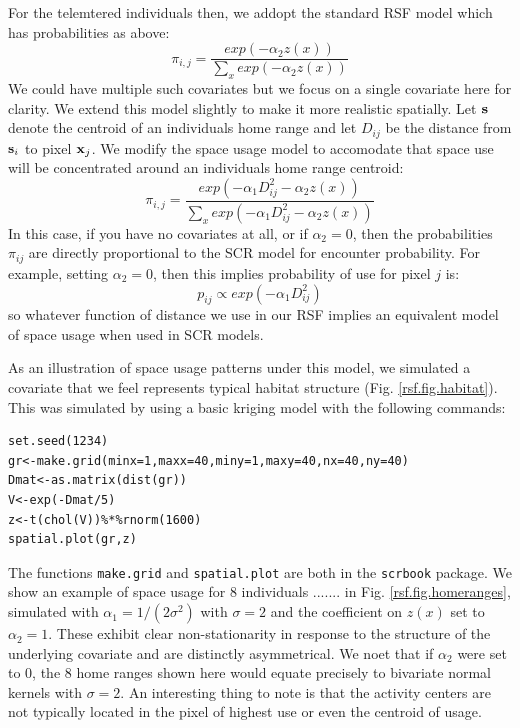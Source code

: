 For the telemtered individuals then, 
we addopt the standard RSF
model  which has probabilities as above:
\[
 \pi_{i,j} = \frac{ exp( -\alpha_{2} z(x) ) }{ \sum_{x} exp(-\alpha_{2} z(x))} 
\]
We could have multiple such covariates but we focus on a
single covariate here for clarity.  We extend this model slightly to
make it more realistic spatially. Let ${\bf s}$ denote the centroid of
an individuals home range and let $D_{ij}$ be the distance from ${\bf
  s}_{i}$ to pixel ${\bf x}_{j}$. We modify the space usage model to
accomodate that space use will be concentrated 
around an individuals home range centroid:
\[
 \pi_{i,j} = \frac{ exp( -\alpha_{1} D_{ij}^{2} -\alpha_{2} z(x) ) }
{ \sum_{x} exp(-\alpha_{1} D_{ij}^{2} -\alpha_{2} z(x))} 
\]
In this case, if you have no covariates at all, or if $\alpha_{2} =
0$, then 
the probabilities $\pi_{ij}$ are directly proportional to the SCR
model for encounter probability.
For example, setting $\alpha_{2} = 0$, then this implies probability
of use for pixel $j$ is:
\[
p_{ij} \propto  exp( -\alpha_{1} D_{ij}^{2})
\]
so whatever function of distance we use in our RSF implies an
equivalent model of space usage when used in SCR models. 

As an illustration of space usage patterns under this model, we
simulated a covariate that we feel represents typical habitat
structure (Fig. \ref{rsf.fig.habitat}). This was simulated by using a
basic kriging model with the following commands:
\begin{verbatim}
set.seed(1234)
gr<-make.grid(minx=1,maxx=40,miny=1,maxy=40,nx=40,ny=40)
Dmat<-as.matrix(dist(gr))
V<-exp(-Dmat/5)
z<-t(chol(V))%*%rnorm(1600)
spatial.plot(gr,z)
\end{verbatim}
The functions \mbox{\tt make.grid} and \mbox{\tt spatial.plot} are
both in the \mbox{\tt scrbook} package.  We show an example of space
usage for 8 individuals ....... in Fig. \ref{rsf.fig.homeranges},
simulated with $\alpha_{1} = 1/(2\sigma^2)$ with $\sigma = 2$ and the
coefficient on $z(x)$ set to $\alpha_{2} = 1$.  These exhibit clear
non-stationarity in response to the structure of the underlying
covariate and are distinctly asymmetrical.  We noet that if
$\alpha_{2}$ were set to 0, the 8 home ranges shown here would equate
precisely to bivariate normal kernels with $\sigma = 2$.  An
interesting thing to note is that the activity centers are not
typically located in the pixel of highest use or even the centroid of
usage.

